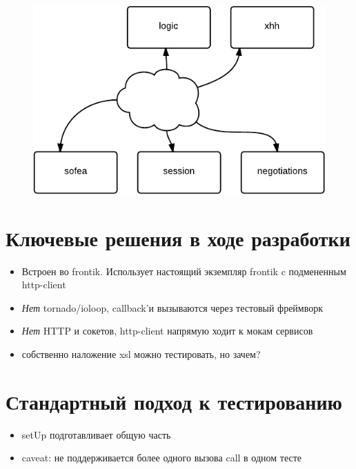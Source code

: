 \documentclass[12pt]{article}
\begin{document}
\section{}
\begin{figure}
\includegraphics[page=1, scale=2]{interconnection.pdf}
%
\end{figure}

\section{Ключевые решения в ходе разработки}

\begin{itemize}
\item Встроен во frontik. Использует настоящий экземпляр frontik c подмененным http-client
\item \emph{Нет} tornado/ioloop, callback'и вызываются через тестовый фреймворк
\item \emph{Нет} HTTP и сокетов, http-client напрямую ходит к мокам сервисов
\item собственно наложение xsl можно тестировать, но зачем?

\end{itemize}

\section{Стандартный подход к тестированию}
\begin{itemize}
\item setUp подготавливает общую часть

\item caveat: не поддерживается более одного вызова call в одном тесте
\end{itemize}
\end{document}
